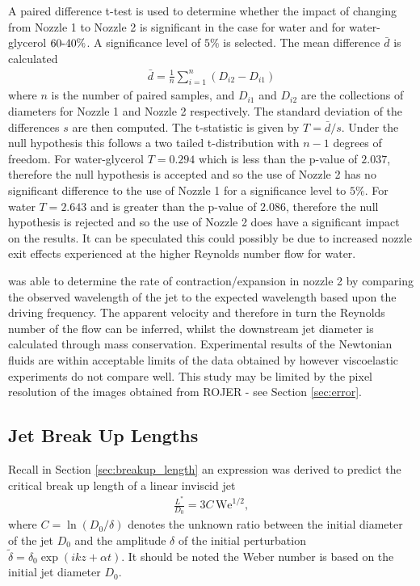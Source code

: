 \documentclass[11pt]{article}
\begin{document}
A paired difference t-test is used to determine whether the impact of changing 
from Nozzle 1 to Nozzle 2 is significant in the case for water and for 
water-glycerol $60 {\text -} 40 \%$. A significance level of $5\%$ is selected. 
The mean difference $\bar{d}$ is calculated
\begin{align*}
\bar{d} = \frac{1}{n} \sum^n_{i=1} \left(D_{i2} - D_{i1} \right)
\end{align*}
where $n$ is the number of paired samples, and $D_{i1}$ and $D_{i2}$ are the 
collections of diameters for Nozzle 1 and Nozzle 2 respectively. The standard 
deviation of the differences $s$ are then computed. The t-statistic is given by
$T = \bar{d}/s$. Under the null hypothesis this follows a two tailed 
t-distribution with $n-1$ degrees of freedom. For water-glycerol $T = 0.294$ 
which is less than the p-value of $2.037$, therefore the null hypothesis is 
accepted and so the use of Nozzle 2 has no significant difference to the use of 
Nozzle 1 for a significance level to $5 \%$. For water $T = 2.643$ and is 
greater than the p-value of $2.086$, therefore the null hypothesis is rejected 
and so the use of Nozzle 2 does have a significant impact on the results. It 
can be speculated this could possibly be due to increased nozzle exit effects 
experienced at the higher Reynolds number flow for water. 

\cite{greiciunas2015report} was able to determine the rate of 
contraction/expansion in nozzle 2 by comparing the observed wavelength of the 
jet to the expected wavelength based upon the driving frequency. The apparent 
velocity and therefore in turn the Reynolds number of the flow can be inferred, 
whilst the downstream jet diameter is calculated through mass conservation. 
Experimental results of the Newtonian fluids are within acceptable limits of 
the data obtained by \cite{middleman1961expansion} however viscoelastic 
experiments do not compare well. This study may be limited by the pixel 
resolution of the images obtained from ROJER - see Section \ref{sec:error}.

\subsection{Jet Break Up Lengths} \label{sec:exp_breakup}
Recall in Section \ref{sec:breakup_length} an expression was derived to predict 
the critical break up length of a linear inviscid jet
\begin{align}
\frac{L^*}{D_0} = 3C \, \mathrm{We}^{1/2},
\label{eqn:inviscid_breakup}
\end{align}
where $C = \ln \left( D_0 / \delta  \right)$ denotes the unknown ratio between 
the initial diameter of the jet $D_0$ and the amplitude $\delta$ of the initial 
perturbation $\tilde{\delta} = \delta_0 \exp (ikz + \alpha t)$. It should be 
noted the Weber number is based on the initial jet diameter $D_0$. 
\end{document}
